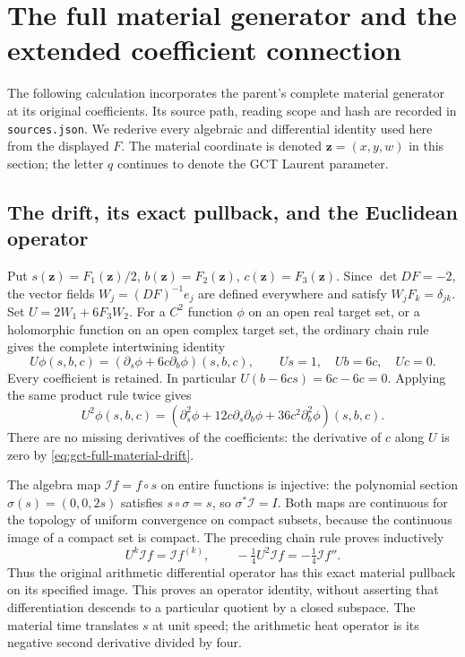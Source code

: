 \section{The full material generator and the extended coefficient connection}
\label{sec:full-material-interface}
The following calculation incorporates the parent's complete material
generator at its original coefficients. Its source path, reading scope
and hash are recorded in \texttt{sources.json}. We rederive every
algebraic and differential identity used here from the displayed $F$.
The material coordinate is denoted $\mathbf z=(x,y,w)$ in this section;
the letter $q$ continues to denote the GCT Laurent parameter.

\subsection{The drift, its exact pullback, and the Euclidean operator}
Put $s(\mathbf z)=F_1(\mathbf z)/2$, $b(\mathbf z)=F_2(\mathbf z)$,
$c(\mathbf z)=F_3(\mathbf z)$. Since $\det DF=-2$, the vector fields
$W_j=(DF)^{-1}e_j$ are defined everywhere and satisfy
$W_jF_k=\delta_{jk}$. Set $U=2W_1+6F_3W_2$.
For a $C^2$ function $\phi$ on an open real target set, or a holomorphic
function on an open complex target set,
the ordinary chain rule gives the complete intertwining identity
\begin{equation}\label{eq:gct-full-material-drift}
 U\phi(s,b,c)=(\partial_s\phi+6c\partial_b\phi)(s,b,c),
 \qquad Us=1,\quad Ub=6c,\quad Uc=0.
\end{equation}
Every coefficient is retained. In particular $U(b-6cs)=6c-6c=0$.
Applying the same product rule twice gives
\[
 U^2\phi(s,b,c)=
 (\partial_s^2\phi+12c\partial_s\partial_b\phi
                +36c^2\partial_b^2\phi)(s,b,c).
\]
There are no missing derivatives of the coefficients: the derivative
of $c$ along $U$ is zero by \eqref{eq:gct-full-material-drift}.

The algebra map $\mathcal I f=f\circ s$ on entire functions is injective:
the polynomial section $\sigma(s)=(0,0,2s)$ satisfies
$s\circ\sigma=s$, so $\sigma^*\mathcal I=I$. Both maps are continuous
for the topology of uniform convergence on compact subsets, because
the continuous image of a compact set is compact. The preceding
chain rule proves inductively
\[
 U^k\mathcal I f=\mathcal I f^{(k)},\qquad
 -\tfrac14U^2\mathcal I f=-\tfrac14\mathcal I f''.
\]
Thus the original arithmetic differential operator has this exact
material pullback on its specified image. This proves an operator
identity, without asserting that differentiation descends to a
particular quotient by a closed subspace. The material time translates
$s$ at unit speed; the arithmetic heat operator is its negative
second derivative divided by four.

